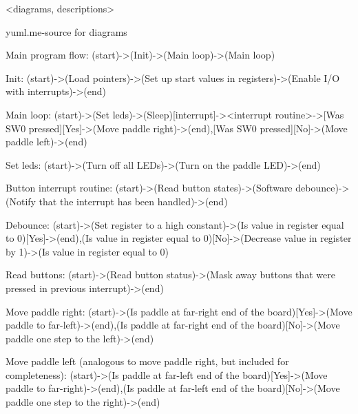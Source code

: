 <diagrams, descriptions>

yuml.me-source for diagrams

Main program flow:
(start)->(Init)->(Main loop)->(Main loop)


Init:
(start)->(Load pointers)->(Set up start values in registers)->(Enable I/O with interrupts)->(end)

Main loop:
(start)->(Set leds)->(Sleep)[interrupt]-><interrupt routine>->[Was SW0 pressed][Yes]->(Move paddle right)->(end),[Was SW0 pressed][No]->(Move paddle left)->(end)


Set leds:
(start)->(Turn off all LEDs)->(Turn on the paddle LED)->(end)

Button interrupt routine:
(start)->(Read button states)->(Software debounce)->(Notify that the interrupt has been handled)->(end)

Debounce:
(start)->(Set register to a high constant)->(Is value in register equal to 0)[Yes]->(end),(Is value in register equal to 0)[No]->(Decrease value in register by 1)->(Is value in register equal to 0)

Read buttons:
(start)->(Read button status)->(Mask away buttons that were pressed in previous interrupt)->(end)

Move paddle right:
(start)->(Is paddle at far-right end of the board)[Yes]->(Move paddle to far-left)->(end),(Is paddle at far-right end of the board)[No]->(Move paddle one step to the left)->(end)

Move paddle left (analogous to move paddle right, but included for completeness):
(start)->(Is paddle at far-left end of the board)[Yes]->(Move paddle to far-right)->(end),(Is paddle at far-left end of the board)[No]->(Move paddle one step to the right)->(end)


